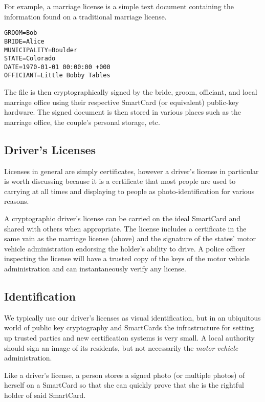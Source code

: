 \documentclass[11pt, twocolumn]{article}
\begin{document}
For example, a marriage license is a simple text document containing the
information found on a traditional marriage license.

\begin{verbatim}
GROOM=Bob
BRIDE=Alice
MUNICIPALITY=Boulder
STATE=Colorado
DATE=1970-01-01 00:00:00 +000
OFFICIANT=Little Bobby Tables
\end{verbatim}

The file is then cryptographically signed by the bride, groom, officiant, and
local marriage office using their respective SmartCard (or equivalent)
public-key hardware. The signed document is then stored in various places such
as the marriage office, the couple's personal storage, etc.

\subsection{Driver's Licenses}

Licenses in general are simply certificates, however a driver's license
in particular is worth discussing because it is a certificate that most people
are used to carrying at all times and displaying to people as
photo-identification for various reasons.

A cryptographic driver's license can be carried on the ideal SmartCard and
shared with others when appropriate. The license includes a certificate in the
same vain as the marriage license (above) and the signature of the states' motor
vehicle administration endorsing the holder's ability to drive. A police officer
inspecting the license will have a trusted copy of the keys of the motor vehicle
administration and can instantaneously verify any license.

\subsection{Identification}

We typically use our driver's licenses as visual identification, but in an
ubiquitous world of public key cryptography and SmartCards the infrastructure
for setting up trusted parties and new certification systems is very small. A
local authority should sign an image of its residents, but not necessarily the
\textit{motor vehicle} administration.

Like a driver's license, a person stores a signed photo (or multiple photos) of
herself on a SmartCard so that she can quickly prove that she is the rightful
holder of said SmartCard.
\end{document}
